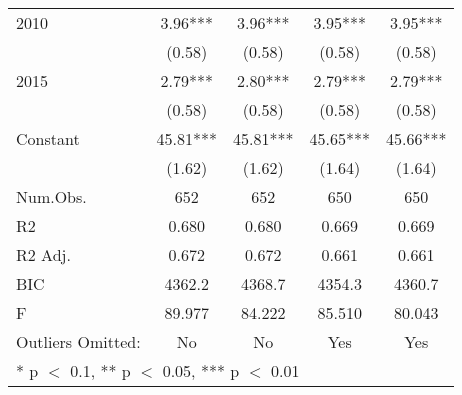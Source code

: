 \begin{table}[H]
\begin{tabular}[t]{lcccc}
2010 & 3.96*** & 3.96*** & 3.95*** & 3.95***\\
 & (0.58) & (0.58) & (0.58) & \vphantom{1} (0.58)\\
2015 & 2.79*** & 2.80*** & 2.79*** & 2.79***\\
 & (0.58) & (0.58) & (0.58) & (0.58)\\
Constant & 45.81*** & 45.81*** & 45.65*** & 45.66***\\
 & (1.62) & (1.62) & (1.64) & (1.64)\\
\midrule
Num.Obs. & 652 & 652 & 650 & 650\\
R2 & 0.680 & 0.680 & 0.669 & 0.669\\
R2 Adj. & 0.672 & 0.672 & 0.661 & 0.661\\
BIC & 4362.2 & 4368.7 & 4354.3 & 4360.7\\
F & 89.977 & 84.222 & 85.510 & 80.043\\
Outliers Omitted: & No & No & Yes & Yes\\
\bottomrule
\multicolumn{5}{l}{\textsuperscript{} * p $<$ 0.1, ** p $<$ 0.05, *** p $<$ 0.01}\\
\end{tabular}
\end{table}

